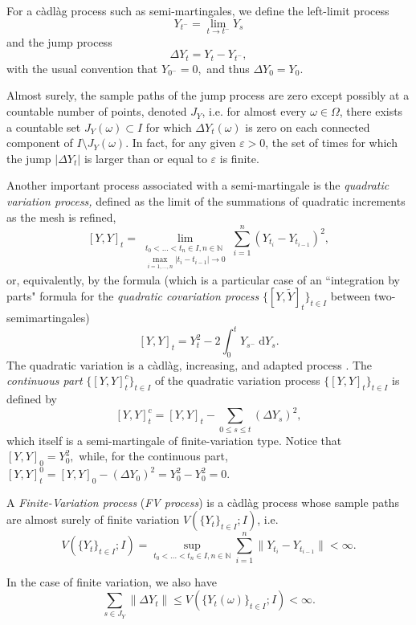 \documentclass[reqno,12pt]{amsart}
\theoremstyle{plain} %
\theoremstyle{definition} %
\begin{document}
For a c\`adl\`ag process such as semi-martingales, we define the left-limit process
\begin{equation}
  Y_{t^{-}} = \lim_{t \rightarrow t^-} Y_s
\end{equation}
and the jump process
\begin{equation}
  \Delta Y_t = Y_t - Y_{t^{-}},
\end{equation}
with the usual convention that $Y_{0^-} = 0,$ and thus $\Delta Y_0 = Y_0.$

Almost surely, the sample paths of the jump process are zero except possibly at a countable number of points, denoted $J_{Y}$, i.e. for almost every $\omega\in \Omega$, there exists a countable set $J_{Y}(\omega) \subset I$ for which $\Delta Y_t(\omega)$ is zero on each connected component of $I\setminus J_{Y}(\omega)$. In fact, for any given $\varepsilon > 0$, the set of times for which the jump $|\Delta Y_t|$ is larger than or equal to $\varepsilon$ is finite.

Another important process associated with a semi-martingale is the \emph{quadratic variation process,} defined as the limit of the summations of quadratic increments as the mesh is refined,
\[
    [Y, Y]_t = \lim_{\substack{t_0 < \ldots < t_n \in I, n\in \mathbb{N} \\ \max_{i=1, \ldots, n}|t_i - t_{i-1}| \rightarrow 0}} \sum_{i=1}^n (Y_{t_i} - Y_{t_{i-1}})^2,
\]
or, equivalently, by the formula (which is a particular case of an ``integration by parts" formula for the \emph{quadratic covariation process} $\{[Y, \tilde Y]_t\}_{t\in I}$ between two-semimartingales)
\[
    [Y, Y]_t = Y_t^2 - 2\int_0^t Y_{s^-} \;\mathrm{d}Y_s.
\]
The quadratic variation is a c\`adl\`ag, increasing, and adapted process \cite[Theorem II.22]{Protter2005}. The \emph{continuous part} $\{[Y, Y]_t^c\}_{t\in I}$ of the quadratic variation process $\{[Y, Y]_t\}_{t\in I}$ is defined by
\[
    [Y, Y]_t^c = [Y, Y]_t - \sum_{0\leq s \leq t} \left(\Delta Y_s\right)^2,
\]
which itself is a semi-martingale of finite-variation type. Notice that $[Y, Y]_0 = Y_0^2,$ while, for the continuous part, $[Y, Y]_t^0 = [Y, Y]_0 - \left(\Delta Y_0\right)^2 = Y_0^2 - Y_0^2 = 0.$

A \emph{Finite-Variation process} (\emph{FV process}) is a c\`adl\`ag process whose sample paths are almost surely of finite variation $V(\{Y_t\}_{t\in I}; I)$, i.e.
\[ V(\{Y_t\}_{t\in I}; I) = \sup_{t_0 < \ldots < t_n \in I, n\in \mathbb{N}} \sum_{i=1}^n \|Y_{t_i} - Y_{t_{i-1}}\| < \infty.
\]

In the case of finite variation, we also have
\begin{equation}
    \label{estimatejumpfv}
    \sum_{s\in J_{Y}} \|\Delta Y_t\| \leq V(\{Y_t(\omega)\}_{t\in I}; I) < \infty.
\end{equation}
\end{document}
